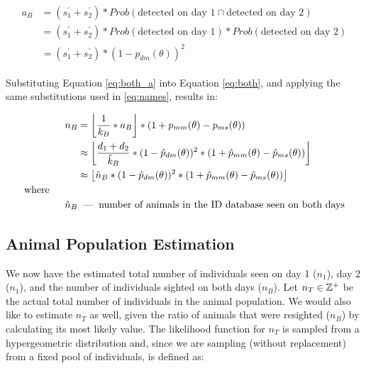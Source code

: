 \begin{align} \label{eq:both_a}
    \begin{split}
        a_{B} &= (s^{\prime}_{1} + s^{\prime}_{2}) * Prob(\text{detected on day 1} \cap \text{detected on day 2}) \\
        &= (s^{\prime}_{1} + s^{\prime}_{2}) * Prob(\text{detected on day 1}) * Prob(\text{detected on day 2}) \\
        &= (s^{\prime}_{1} + s^{\prime}_{2}) * (1 - p_{dm}(\theta))^2
    \end{split}
\end{align}

\noindent Substituting Equation \eqref{eq:both_a} into Equation \eqref{eq:both}, and applying the same substitutions used in \eqref{eq:names}, results in:

\begin{align} \label{eq:individuals_both}
    \begin{split}
        n_{B} &= \left\lfloor \frac{1}{k_{B}} * a_{B} \right\rfloor * (1 + p_{mm}(\theta) - p_{ms}(\theta)) \\
        &\approx \left\lfloor \frac{d_{1} + d_{2}}{\hat{k}_{B}} * (1 - \hat{p}_{dm}(\theta))^2 * (1 + \hat{p}_{mm}(\theta) - \hat{p}_{ms}(\theta)) \right\rfloor \\
        &\approx \left\lfloor \hat{n}_{B} * (1 - \hat{p}_{dm}(\theta))^2 * (1 + \hat{p}_{mm}(\theta) - \hat{p}_{ms}(\theta)) \right\rfloor \\
        \text{where} \hspace{1cm} & \\
        \hat{n}_{B} &\textnormal{\hspace{0.2cm}---\hspace{0.2cm}} \text{number of animals in the ID database seen on both days}
    \end{split}
\end{align}

\subsection{Animal Population Estimation}

We now have the estimated total number of individuals seen on day 1 ($n_{1}$), day 2 ($n_{1}$), and the number of individuals sighted on both days ($n_{B}$).  Let $n_{T} \in \mathbb{Z}^{+}$ be the actual total number of individuals in the animal population.  We would also like to estimate $n_{T}$ as well, given the ratio of animals that were resighted ($n_{B}$) by calculating its most likely value.  The likelihood function for $n_{T}$ is sampled from a hypergeometric distribution and, since we are sampling (without replacement) from a fixed pool of individuals, is defined as:

